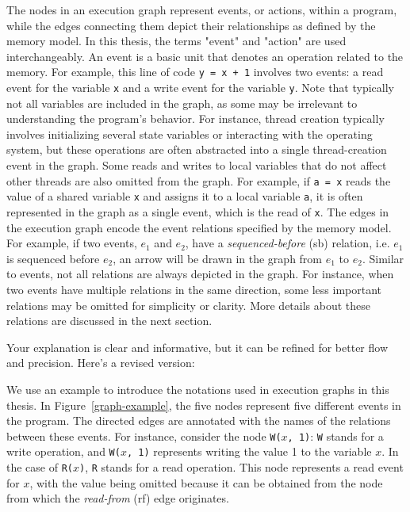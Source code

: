 The nodes in an execution graph represent events, or actions, within a program, while the edges connecting them depict their relationships as defined by the memory model. In this thesis, the terms "event" and "action" are used interchangeably. An event is a basic unit that denotes an operation related to the memory. For example, this line of code \texttt{y = x + 1} involves two events: a read event for the variable \texttt{x} and a write event for the variable \texttt{y}. Note that typically not all variables are included in the graph, as some may be irrelevant to understanding the program's behavior. For instance, thread creation typically involves initializing several state variables or interacting with the operating system, but these operations are often abstracted into a single thread-creation event in the graph. Some reads and writes to local variables that do not affect other threads are also omitted from the graph. For example, if \texttt{a = x} reads the value of a shared variable \texttt{x} and assigns it to a local variable \texttt{a}, it is often represented in the graph as a single event, which is the read of \texttt{x}. The edges in the execution graph encode the event relations specified by the memory model. For example, if two events, $e_1$ and $e_2$, have a \textit{sequenced-before} (sb) relation, i.e. $e_1$ is sequenced before $e_2$, an arrow will be drawn in the graph from $e_1$ to $e_2$. Similar to events, not all relations are always depicted in the graph. For instance, when two events have multiple relations in the same direction, some less important relations may be omitted for simplicity or clarity. More details about these relations are discussed in the next section.


Your explanation is clear and informative, but it can be refined for better flow and precision. Here's a revised version:

We use an example to introduce the notations used in execution graphs in this thesis. In Figure~\ref{graph-example}, the five nodes represent five different events in the program. The directed edges are annotated with the names of the relations between these events. For instance, consider the node \texttt{W($x$, 1)}: \texttt{W} stands for a write operation, and \texttt{W($x$, 1)} represents writing the value 1 to the variable \texttt{$x$}. In the case of \texttt{R($x$)}, \texttt{R} stands for a read operation. This node represents a read event for \texttt{$x$}, with the value being omitted because it can be obtained from the node from which the \textit{read-from} (rf) edge originates.

